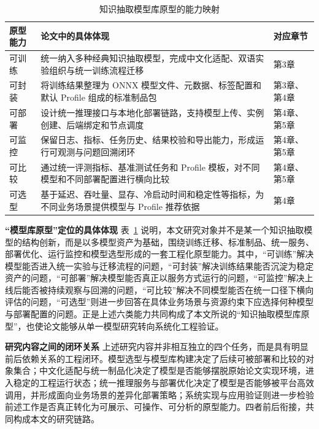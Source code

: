 \begin{table}[htbp]
  \centering
  \caption{知识抽取模型库原型的能力映射}
  \vspace{0.5em}\wuhao
  \begin{tabularx}{\textwidth}{l X X}
    \toprule
    原型能力 & 论文中的具体体现 & 对应章节 \\
    \midrule
    可训练 & 统一纳入多种经典知识抽取模型，完成中文化适配、双语实验组织与统一训练流程迁移 & 第3章 \\
    可封装 & 将训练结果整理为 ONNX 模型文件、元数据、标签配置和默认 Profile 组成的标准制品包 & 第3章、第4章 \\
    可部署 & 设计统一推理接口与本地化部署链路，支持模型上传、实例创建、后端绑定和节点调度 & 第4章、第5章 \\
    可监控 & 保留日志、指标、任务历史、结果校验和导出能力，形成运行可观测与问题回溯闭环 & 第4章、第5章 \\
    可比较 & 通过统一评测指标、基准测试任务和 Profile 模板，对不同模型和不同部署配置进行横向比较 & 第4章、第5章 \\
    可选型 & 基于延迟、吞吐量、显存、冷启动时间和稳定性等指标，为不同业务场景提供模型与 Profile 推荐依据 & 第4章 \\
    \bottomrule
  \end{tabularx}
  \label{tab:intro_capability_mapping}
\end{table}

\par\textbf{“模型库原型”定位的具体体现}
表~\ref{tab:intro_capability_mapping} 说明，本文研究对象并不是某一个知识抽取模型的结构创新，而是以多模型资产为基础，围绕训练迁移、标准制品、统一服务、部署优化、运行监控和模型选型形成的一套工程化原型能力。其中，“可训练”解决模型能否进入统一实验与迁移流程的问题，“可封装”解决训练结果能否沉淀为稳定资产的问题，“可部署”解决模型能否真正以服务方式运行的问题，“可监控”解决上线后能否被持续观察与回溯的问题，“可比较”解决不同模型能否在统一口径下横向评估的问题，“可选型”则进一步回答在具体业务场景与资源约束下应选择何种模型与部署配置的问题。正是上述六类能力共同构成了本文所说的“知识抽取模型库原型”，也使论文能够从单一模型研究转向系统化工程验证。

\par\textbf{研究内容之间的闭环关系}
上述研究内容并非相互独立的四个任务，而是具有明显前后依赖关系的工程闭环。模型选型与模型库构建决定了后续可被部署和比较的对象集合；中文化适配与统一制品化决定了模型是否能够摆脱原始论文实现环境，进入稳定的工程运行状态；统一推理服务与部署优化决定了模型是否能够被平台高效调用，并形成面向业务场景的差异化部署策略；系统实现与应用验证则进一步检验前述工作是否真正转化为可展示、可操作、可分析的原型能力。四者前后衔接，共同构成本文的研究链路。

